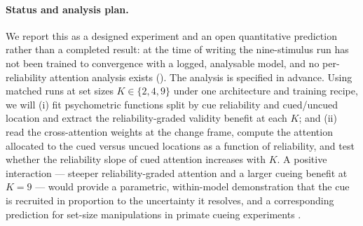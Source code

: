 \paragraph{Status and analysis plan.}
We report this as a designed experiment and an open quantitative prediction rather than a
completed result: at the time of writing the nine-stimulus run has not been trained to
convergence with a logged, analysable model, and no per-reliability attention analysis exists
().
The analysis is specified in advance. Using matched runs at set sizes $K\in\{2,4,9\}$ under one
architecture and training recipe, we will (i) fit psychometric functions split by cue
reliability and cued/uncued location and extract the reliability-graded validity benefit at each
$K$; and (ii) read the cross-attention weights at the change frame, compute the attention
allocated to the cued versus uncued locations as a function of reliability, and test whether the
reliability slope of cued attention increases with $K$. A positive interaction --- steeper
reliability-graded attention and a larger cueing benefit at $K=9$ --- would provide a parametric,
within-model demonstration that the cue is recruited in proportion to the uncertainty it
resolves, and a corresponding prediction for set-size manipulations in primate cueing
experiments \citep{mayo2016graded, eckstein2013visual}.
